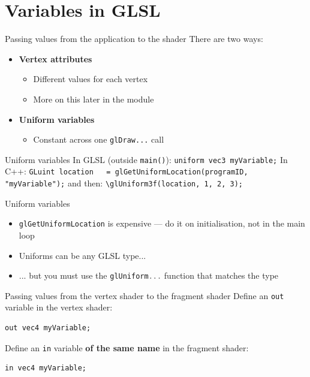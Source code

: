 \part{Variables in GLSL}
\frame{\partpage}

\begin{frame}{Passing values from the application to the shader}
	There are two ways:
	\begin{itemize}
		\pause\item \textbf{Vertex attributes}
			\begin{itemize}
				\pause\item Different values for each vertex
				\pause\item More on this later in the module
			\end{itemize}
		\pause\item \textbf{Uniform variables}
			\begin{itemize}
				\pause\item Constant across one \lstinline{glDraw...} call
			\end{itemize}
	\end{itemize}
\end{frame}

\begin{frame}[fragile]{Uniform variables}
	\pause In GLSL (outside \lstinline{main()}):
	\lstinline{uniform vec3 myVariable;}
	\pause In C++:
	\lstinline{GLuint location
  = glGetUniformLocation(programID, "myVariable");}
	\pause and then:
	\lstinline{\glUniform3f(location, 1, 2, 3);}
\end{frame}

\begin{frame}{Uniform variables}
	\begin{itemize}
		\pause\item \lstinline[language=C++]{glGetUniformLocation} is expensive --- do it on initialisation, not in the main loop
		\pause\item Uniforms can be any GLSL type...
		\pause\item ... but you must use the \lstinline[language=C++]{glUniform...} function that matches the type
	\end{itemize}
\end{frame}

\begin{frame}[fragile]{Passing values from the vertex shader to the fragment shader}
	\pause Define an \lstinline{out} variable in the vertex shader:
	\pause \begin{lstlisting}
out vec4 myVariable;
	\end{lstlisting}
	\pause Define an \lstinline{in} variable \textbf{of the same name} in the fragment shader:
	\pause \begin{lstlisting}
in vec4 myVariable;
	\end{lstlisting}
\end{frame}

